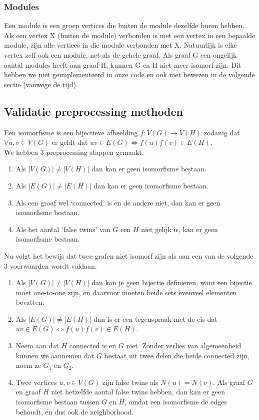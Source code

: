 \documentclass{article}
\begin{document}
\begin{algorithm}[H]
\subsubsection{Modules}
Een module is een groep vertices die buiten de module dezelfde buren hebben. Als een vertex X (buiten de module) verbonden is met een vertex in een bepaalde module, zijn alle vertices in die module verbonden met X. Natuurlijk is elke vertex zelf ook een module, net als de gehele graaf. Als graaf G een ongelijk aantal modules heeft aan graaf H, kunnen G en H niet meer isomorf zijn. Dit hebben we niet ge\"implementeerd in onze code en ook niet bewezen in de volgende sectie (vanwege de tijd).

\subsection{Validatie preprocessing methoden}

Een isomorfisme is een bijectieve afbeelding $f:V(G) \rightarrow V(H)$ zodanig dat $\forall u,v \in V(G)$ er geldt dat $uv \in E(G) \Leftrightarrow f(u)f(v)\in E(H)$.\\

We hebben 3 preprocessing stappen gemaakt.
\begin{enumerate}
\item Als $|V(G)|\neq|V(H)|$ dan kan er geen isomorfisme bestaan.
\item Als $|E(G)|\neq|E(H)|$ dan kan er geen isomorfisme bestaan.
\item Als een graaf wel `connected' is en de andere niet, dan kan er geen isomorfisme bestaan.
\item Als het aantal `false twins' van $G$ een $H$ niet gelijk is, kan er geen isomorfisme bestaan.
\end{enumerate}

Nu volgt het bewijs dat twee grafen niet isomorf zijn als aan een van de volgende 3 voorwaarden wordt voldaan:
\begin{enumerate}
\item Als $|V(G)|\neq|V(H)|$ dan kan je geen bijectie defini\"eren, want een bijectie moet one-to-one zijn, en daarvoor moeten beide sets evenveel elementen bevatten.
\item Als $|E(G)|\neq|E(H)|$ dan is er een tegenspraak met de eis dat $uv\in E(G)\Leftrightarrow f(u)f(v)\in E(H)$.
\item Neem aan dat $H$ connected is en $G$ niet. Zonder verlies van algemeenheid kunnen we aannemen dat $G$ bestaat uit twee delen die beide connected zijn, noem ze $G_1$ en $G_2$.
\item Twee vertices $u, v \in V(G)$ zijn false twins als $N(u)=N(v)$. Als graaf $G$ en graaf $H$ niet hetzelfde aantal false twins hebben, dan kan er geen isomorfisme bestaan tussen $G$ en $H$, omdat een isomorfisme de edges behoudt, en dus ook de neighborhood.


\end{enumerate}
\end{algorithm}
\end{document}
